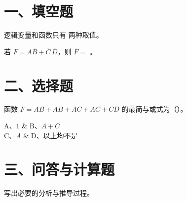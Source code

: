\documentclass[12pt,a4paper]{scrartcl}
\begin{document}
\makecompacttitle

\section*{一、填空题}
\begin{questions}
  \item 逻辑变量和函数只有  两种取值。
  \item 若 $F=A\overline B+\overline C\,\overline D$，则 $\overline F=$ \fillin[4.5cm]{}。
\end{questions}

\section*{二、选择题}
\begin{questions}
  \item 函数 $F=AB+A\overline B+\overline AC+AC+CD$ 的最简与或式为（\quad）。
  \begin{choices}
    A、$1$ & B、$A+C$ \\
    C、$A$ & D、以上均不是
  \end{choices}
\end{questions}

\section*{三、问答与计算题}
\begin{questions}
  \item 写出必要的分析与推导过程。
  \answerspace{3cm}
\end{questions}
\end{document}
